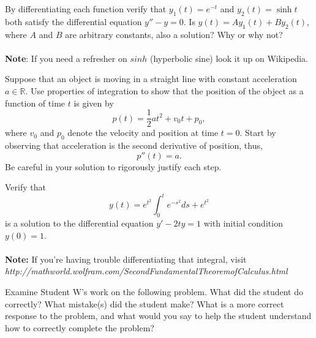 \documentclass[12pt,letterpaper]{hmcpset}
\begin{document}

\begin{problem}[2]
  By differentiating each function verify that $y_1(t)=e^{-t}$ and $y_2(t)=\sinh t$ both satisfy the differential equation $y''-y=0$. Is $y(t)=Ay_1(t)+By_2(t)$, where $A$ and $B$ are arbitrary constants, also a solution? Why or why not?
  \\\\
  \textbf{Note}: If you need a refresher on $sinh$ (hyperbolic sine) look it up on Wikipedia.
\end{problem}

\begin{solution}
\vfill
\end{solution}
\newpage

\begin{problem}[3]
  Suppose that an object is moving in a straight line with constant acceleration $a \in \mathbb{R}$.  Use properties of integration to show that the position of the object as a function of time $t$ is given by $$p(t) = \frac{1}{2} a t^2 + v_0 t + p_0,$$ where $v_0$ and $p_0$ denote the velocity and position at time $t=0$.   Start by observing that acceleration is the second derivative of position, thus, 
  \[  p''(t) = a.  \]
  Be careful in your solution to rigorously justify each step.
\end{problem}

\begin{solution}
\vfill
\end{solution}
\newpage

\begin{problem}[4]
  Verify that 
  \[ y(t)=e^{t^2}\int_0^te^{-s^2}ds+e^{t^2} \]
  is a solution to the differential equation $y'-2ty=1$ with initial condition $y(0)=1$.
  \\\\
  \textbf{Note:} If you're having trouble differentiating that integral, visit\\
  \textit{http://mathworld.wolfram.com/SecondFundamentalTheoremofCalculus.html}
\end{problem}

\begin{solution}
\vfill
\end{solution}
\newpage

\begin{problem}[5]
  Examine Student W's work on the following problem.  What did the student do correctly?  What mistake(s) did the student make?  What is a more correct response to the problem, and what would you say to help the student understand how to correctly complete the problem?

  \begin{center}
  \end{center}
  \hspace{10pt}
\end{problem}

\begin{solution}
\vfill
\end{solution}
\newpage
\end{document}
